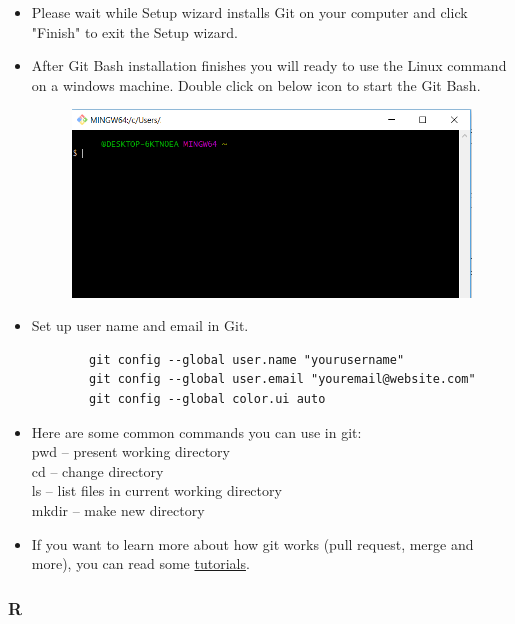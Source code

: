 \documentclass[11pt]{article} %
\begin{document}
\begin{itemize}
      	\item Please wait while Setup wizard installs Git on your computer and click "Finish" to exit the Setup wizard. 
      	\item After Git Bash installation finishes you will ready to use the Linux command on a windows machine. 
        Double click on below icon to start the Git Bash. 
      		\begin{figure}[h!]
      			\centering
      			\includegraphics[width=0.7\linewidth]{figs/Launch-Git-Bash.png}
      			\caption{}
      			\label{fig:launchgitbash}
      		\end{figure}
      	\item Set up user name and email in Git.
      	\begin{lstlisting}
      	git config --global user.name "yourusername"
      	git config --global user.email "youremail@website.com"
      	git config --global color.ui auto
      	\end{lstlisting}
      	\item Here are some common commands you can use in git:\\
      		pwd -- present working directory\\
      		cd -- change directory\\
      		ls -- list files in current working directory\\
      		mkdir -- make new directory\\
      	\item If you want to learn more about how git works (pull request, merge and more), you can read some \href{https://www.atlassian.com/git}{tutorials}. 
      	
      \end{itemize}
    
    \subsubsection{R}
    
\end{document}
